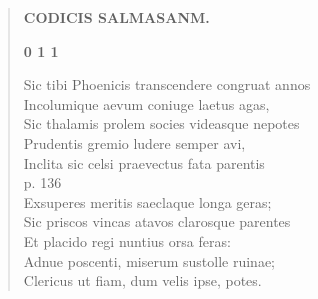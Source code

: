 \documentclass[11pt, a4paper]{report}
\begin{document}
\begin{verse}
    \begin{center} \textbf{CODICIS SALMASANM.} \end{center}\begin{center} \textbf{0 1 1} \end{center}Sic tibi Phoenicis transcendere congruat annos \\ Incolumique aevum coniuge laetus agas, \\ Sic thalamis prolem socies videasque nepotes \\ Prudentis gremio ludere semper avi, \\ Inclita sic celsi praevectus fata parentis \\ p. 136 \\ Exsuperes meritis saeclaque longa geras; \\ Sic priscos vincas atavos clarosque parentes \\ Et placido regi nuntius orsa feras: \\ Adnue poscenti, miserum sustolle ruinae; \\ Clericus ut fiam, dum velis ipse, potes. \\ 
      \end{verse}
  
\end{document}
